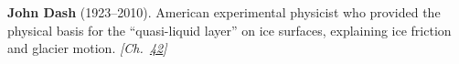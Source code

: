 \textbf{John Dash} (1923–2010). American experimental physicist who provided the physical basis for the ``quasi-liquid layer'' on ice surfaces, explaining ice friction and glacier motion. \emph{[Ch.~\hyperref[ch:iceslipperiness]{42}]}

